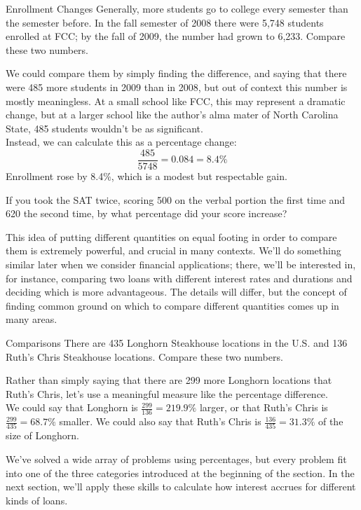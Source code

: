 \begin{example}[https://www.youtube.com/watch?v=Bhqb1XOWcQQ]{Enrollment Changes}
Generally, more students go to college every semester than the semester before.  In the fall semester of 2008 there were 5,748 students enrolled at FCC; by the fall of 2009, the number had grown to 6,233.  Compare these two numbers.

\sol
We could compare them by simply finding the difference, and saying that there were 485 more students in 2009 than in 2008, but out of context this number is mostly meaningless.  At a small school like FCC, this may represent a dramatic change, but at a larger school like the author's alma mater of North Carolina State, 485 students wouldn't be as significant.\\

Instead, we can calculate this as a percentage change:
\[\dfrac{485}{5748} = 0.084 = 8.4\%\]
Enrollment rose by 8.4\%, which is a modest but respectable gain.
\end{example}

\begin{try}
If you took the SAT twice, scoring 500 on the verbal portion the first time and 620 the second time, by what percentage did your score increase?
\end{try}
\pagebreak

This idea of putting different quantities on equal footing in order to compare them is extremely powerful, and crucial in many contexts.  We'll do something similar later when we consider financial applications; there, we'll be interested in, for instance, comparing two loans with different interest rates and durations and deciding which is more advantageous.  The details will differ, but the concept of finding common ground on which to compare different quantities comes up in many areas.

\begin{example}{Comparisons}
There are 435 Longhorn Steakhouse locations in the U.S. and 136 Ruth's Chris Steakhouse locations.  Compare these two numbers.

\sol
Rather than simply saying that there are 299 more Longhorn locations that Ruth's Chris, let's use a meaningful measure like the percentage difference.\\

We could say that Longhorn is $\frac{299}{136} = 219.9\%$ larger, or that Ruth's Chris is $\frac{299}{435} = 68.7\%$ smaller.  We could also say that Ruth's Chris is $\frac{136}{435} = 31.3\%$ of the size of Longhorn.
\end{example}

We've solved a wide array of problems using percentages, but every problem fit into one of the three categories introduced at the beginning of the section.  In the next section, we'll apply these skills to calculate how interest accrues for different kinds of loans.